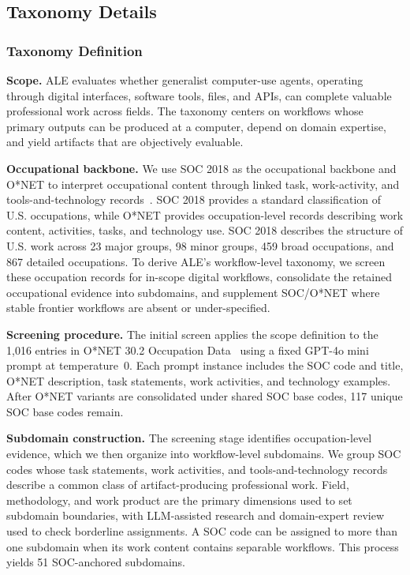\subsection{Taxonomy Details}
\label{app:taxonomy}

\subsubsection{Taxonomy Definition}
\label{app:taxonomy-definition}

\noindent \textbf{Scope.}
ALE evaluates whether generalist computer-use agents, operating through digital interfaces, software
tools, files, and APIs, can complete valuable professional work across fields. The taxonomy centers
on workflows whose primary outputs can be produced at a computer, depend on domain expertise,
and yield artifacts that are objectively evaluable.

\noindent \textbf{Occupational backbone.}
We use SOC 2018 as the occupational backbone and O*NET to interpret occupational content through
linked task, work-activity, and tools-and-technology records~\citep{bls2018soc,peterson2001onet,onet302database}.
SOC 2018 provides a standard classification of U.S. occupations, while O*NET provides
occupation-level records describing work content, activities, tasks, and technology use. SOC 2018
describes the structure of U.S. work across 23 major groups, 98 minor groups, 459 broad occupations,
and 867 detailed occupations. To derive ALE's workflow-level taxonomy, we screen these occupation
records for in-scope digital workflows, consolidate the retained occupational evidence into
subdomains, and supplement SOC/O*NET where stable frontier workflows are absent or under-specified.

\noindent \textbf{Screening procedure.}
The initial screen applies the scope definition to the 1{,}016 entries in O*NET 30.2 Occupation
Data~\citep{onet302database} using a fixed GPT-4o mini prompt at temperature~0. Each prompt
instance includes the SOC code and title, O*NET description, task statements, work activities, and
technology examples. After O*NET variants are consolidated under shared SOC base codes, 117 unique
SOC base codes remain.

\noindent \textbf{Subdomain construction.}
The screening stage identifies occupation-level evidence, which we then organize into workflow-level
subdomains. We group SOC codes whose task statements, work activities, and tools-and-technology
records describe a common class of artifact-producing professional work. Field, methodology, and
work product are the primary dimensions used to set subdomain boundaries, with LLM-assisted
research and domain-expert review used to check borderline assignments. A SOC code can be assigned
to more than one subdomain when its work content contains separable workflows. This process yields
51 SOC-anchored subdomains.

